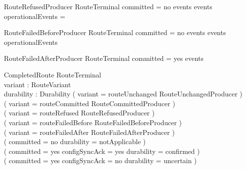 \documentclass{article}
\begin{document}
\begin{schema}{RouteRefusedProducer}
	RouteTerminal
	\where
	committed = no \land events \neq \emptyset \land
	events \cap operationalEvents = \emptyset
\end{schema}

\begin{schema}{RouteFailedBeforeProducer}
	RouteTerminal
	\where
	committed = no \land events \neq \emptyset \land
	events \cap operationalEvents \neq \emptyset
\end{schema}

\begin{schema}{RouteFailedAfterProducer}
	RouteTerminal
	\where
	committed = yes \land events \neq \emptyset
\end{schema}

\begin{schema}{CompletedRoute}
	RouteTerminal \\
	variant : RouteVariant \\
	durability : Durability
	\where
	( variant = routeUnchanged \iff RouteUnchangedProducer ) \\
	( variant = routeCommitted \iff RouteCommittedProducer ) \\
	( variant = routeRefused \iff RouteRefusedProducer ) \\
	( variant = routeFailedBefore \iff RouteFailedBeforeProducer ) \\
	( variant = routeFailedAfter \iff RouteFailedAfterProducer ) \\
	( committed = no \iff durability = notApplicable ) \\
	( committed = yes \land configSyncAck = yes \iff durability = confirmed ) \\
	( committed = yes \land configSyncAck = no \iff durability = uncertain )
\end{schema}
\end{document}
